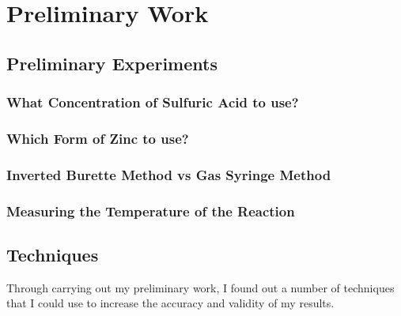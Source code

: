 \chapter {Preliminary Work}

\section {Preliminary Experiments}

	\subsection {What Concentration of Sulfuric Acid to use?}


	\subsection{Which Form of Zinc to use?}


	\subsection{Inverted Burette Method vs Gas Syringe Method}


	\subsection{Measuring the Temperature of the Reaction}



\section {Techniques}

Through carrying out my preliminary work, I found out a number of techniques that I could use to increase the accuracy and validity of my results.